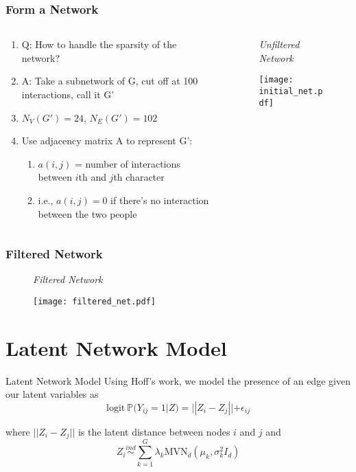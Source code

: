 \documentclass[handout]{beamer}
\begin{document}
\begin{frame}
\frametitle{Form a Network}

\begin{minipage}{\textwidth}
\begin{columns}[T]
\begin{column}{0.4\textwidth}
\begin{enumerate}[a]
\item Q: How to handle the sparsity of the network? 
\item A: Take a subnetwork of G, cut off at 100 interactions, call it G'
\item $N_V (G')= 24$, $N_E (G') = 102$
\item Use adjacency matrix A to represent G': 
 \begin{enumerate}[i]
  \item $a(i, j)$ = number of interactions between $i$th and $j$th character
  \item  i.e., $a(i, j) = 0$ if there's no interaction between the two people
 \end{enumerate}
\end{enumerate}
\end{column}
\begin{column}{0.6\textwidth}
\begin{figure}
\textit{Unfiltered Network}\par
\centering
\texttt{[image: initial\_net.pdf]}
\end{figure}
\end{column}
\end{columns}
\end{minipage}
\end{frame} 


\begin{frame}
\frametitle{Filtered Network}
\begin{figure}
\textit{Filtered Network}\par
\centering
\texttt{[image: filtered\_net.pdf]}
\end{figure}

\end{frame} 


%
%

\section{Latent Network Model}
\begin{frame}{Latent Network Model}
Using Hoff's work, we model the presence of an edge given our latent variables as
\[\text{logit} \ \mathbb{P}(Y_{ij} = 1|Z) = ||Z_i - Z_j|| + \epsilon_{ij}\]

where $||Z_i - Z_j||$ is the latent distance between nodes $i$ and $j$ and 
\[Z_i \overset{ind}{\sim}\sum_{k=1}^G \lambda_k\text{MVN}_d(\mu_k,\sigma_k^2I_d)\]

\end{frame}
\end{document}
